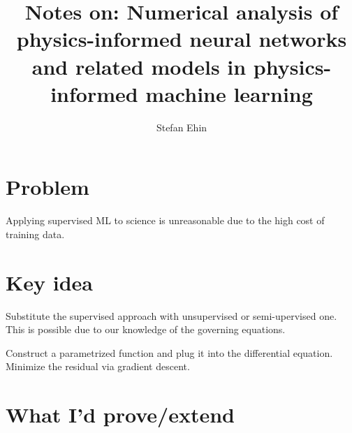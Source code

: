 \documentclass{article}
\author{Stefan Ehin}
\title{Notes on: Numerical analysis of physics-informed neural networks and related models in physics-informed machine learning}
\begin{document}
\maketitle

\section*{Problem}
Applying supervised ML to science is unreasonable due to the high cost of training data.

\section*{Key idea}
Substitute the supervised approach with unsupervised or semi-upervised one. This is possible due to our knowledge of the governing equations.

Construct a parametrized function and plug it into the differential equation. Minimize the residual via gradient descent.
 
\section*{What I'd prove/extend}
	
\end{document}
